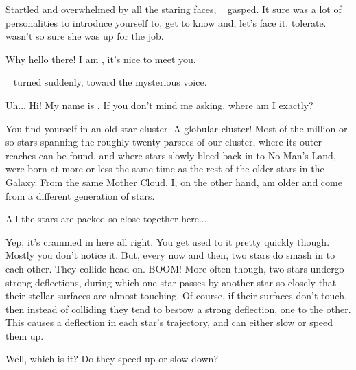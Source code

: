 \documentclass[main.tex]{subfiles}
\begin{document}
\par \nar Startled and overwhelmed by all the staring faces, \rmsterope~ gasped.  It sure was a lot of personalities to introduce yourself to, get to know and, let's face it, tolerate.  \rmsterope~ wasn't so sure she was up for the job.

\par \Enrico Why hello there!  I am \rmenrico, it's nice to meet you.

\par \nar \rmsterope~ turned suddenly, toward the mysterious voice.

\par \Sterope Uh...  Hi!  My name is \rmsterope.  If you don't mind me asking, where am I exactly?

\par \Enrico You find yourself in an old star cluster.  A globular cluster!  Most of the million or so stars spanning the roughly twenty parsecs of our cluster, where its outer reaches can be found, and where stars slowly bleed back in to No Man's Land, were born at more or less the same time as the rest of the older stars in the Galaxy.  From the same Mother Cloud.  I, on the other hand, am older and come from a different generation of stars.  

\par \Sterope All the stars are packed so close together here...

\par \Enrico Yep, it's crammed in here all right.  You get used to it pretty quickly though.  Mostly you don't notice it.  But, every now and then, two stars do smash in to each other.  They collide head-on.  BOOM!  More often though, two stars undergo strong deflections, during which one star passes by another star so closely that their stellar surfaces are almost touching.  Of course, if their surfaces don't touch, then instead of colliding they tend to bestow a strong deflection, one to the other.  This causes a deflection in each star's trajectory, and can either slow or speed them up.  

\par \Sterope Well, which is it?  Do they speed up or slow down?
\end{document}
